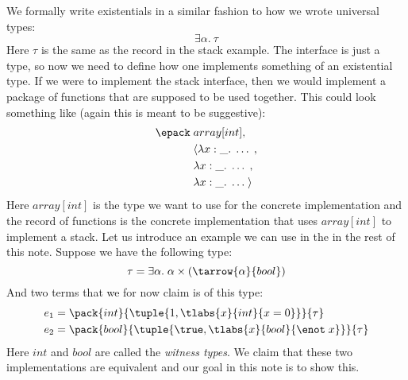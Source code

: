 We formally write existentials in a similar fashion to how we wrote universal types:
\[
  \exists \alpha. \: \tau
\]
Here $\tau$ is the same as the record in the stack example. The interface is just a type, so now we need to define how one implements something of an existential type. If we were to implement the stack interface, then we would implement a package of functions that are supposed to be used together. This could look something like (again this is meant to be suggestive):
\begin{align*}
  \epack\; &array[int], \\
         & \langle \lambda x:\_.\; \dots\;,\\
         & \lambda x:\_.\; \dots\;,\\
         & \lambda x:\_.\; \dots\; \rangle
\end{align*}
Here $array[int]$ is the type we want to use for the concrete implementation and the record of functions is the concrete implementation that uses $array[int]$ to implement a stack. Let us introduce an example we can use in the in the rest of this note. Suppose we have the following type:
\[
  \tau = \exists \alpha. \; \alpha \times (\tarrow{\alpha}{bool})
\]
And two terms that we for now claim is of this type:
\begin{align*}
  e_1 & = \pack{int}{\tuple{1, \tlabs{x}{int}{x=0}}}{\tau} \\
  e_2 & = \pack{bool}{\tuple{\true, \tlabs{x}{bool}{\enot\; x}}}{\tau}
\end{align*}
Here $int$ and $bool$ are called the \emph{witness types}. We claim that these two implementations are equivalent and our goal in this note is to show this.

